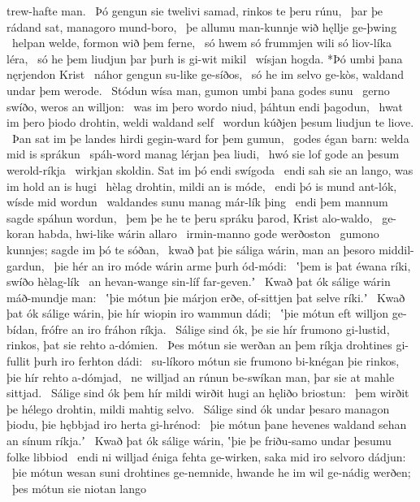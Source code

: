 trew-hafte man. \hld\ Þó gengun sie twelivi samad,
rinkos te þeru rúnu, \hld\ þar þe rádand sat,
managoro mund-boro, \hld\ þe allumu man-kunnje
wið hęllje ge-þwing \hld\ helpan welde,
formon wið þem ferne, \hld\ só hwem só frummjen wili
só liov-líka léra, \hld\ só he þem liudjun þar
þurh is gi-wit mikil \hld\ wísjan hogda.
*Þó umbi þana nęrjendon Krist \hld\ náhor gengun
su-like ge-síðos, \hld\ só he im selvo ge-kòs,
waldand undar þem werode. \hld\ Stódun wísa man,
gumon umbi þana godes sunu \hld\ gerno swíðo,
weros an willjon: \hld\ was im þero wordo niud,
þáhtun endi þagodun, \hld\ hwat im þero þiodo drohtin,
weldi waldand self \hld\ wordun kúðjen
þesum liudjun te liove. \hld\ Þan sat im þe landes hirdi
gegin-ward for þem gumun, \hld\ godes égan barn:
welda mid is sprákun \hld\ spáh-word manag
lérjan þea liudi, \hld\ hwó sie lof gode
an þesum werold-ríkja \hld\ wirkjan skoldin.
Sat im þó endi swígoda \hld\ endi sah sie an lango,
was im hold an is hugi \hld\ hèlag drohtin,
mildi an is móde, \hld\ endi þó is mund ant-lók,
wísde mid wordun \hld\ waldandes sunu
manag már-lík þing \hld\ endi þem mannum sagde
spáhun wordun, \hld\ þem þe he te þeru spráku þarod,
Krist alo-waldo, \hld\ ge-koran habda,
hwi-like wárin allaro \hld\ irmin-manno
gode werðoston \hld\ gumono kunnjes;
sagde im þó te sóðan, \hld\ kwað þat þie sáliga wárin,
man an þesoro middil-gardun, \hld\ þie hér an iro móde wárin
arme þurh ód-módi: \hld\ ʽþem is þat éwana ríki,
swíðo hèlag-lík \hld\ an hevan-wange
sin-líf far-geven.ʼ \hld\ Kwað þat ók sálige wárin
máð-mundje man: \hld\ ʽþie mótun þie márjon erðe,
of-sittjen þat selve ríki.ʼ \hld\ Kwað þat ók sálige wárin,
þie hír wiopin iro wammun dádi; \hld\ ʽþie mótun eft willjon ge-bídan,
frófre an iro fráhon ríkja. \hld\ Sálige sind ók, þe sie hír frumono gi-lustid,
rinkos, þat sie rehto a-dómien. \hld\ Þes mótun sie werðan an þem ríkja drohtines
gi-fullit þurh iro ferhton dádi: \hld\ su-líkoro mótun sie frumono bi-knégan
þie rinkos, þie hír rehto a-dómjad, \hld\ ne willjad an rúnun be-swíkan
man, þar sie at mahle sittjad. \hld\ Sálige sind ók þem hír mildi wirðit
hugi an hęliðo briostun: \hld\ þem wirðit þe hélego drohtin,
mildi mahtig selvo. \hld\ Sálige sind ók undar þesaro managon þiodu,
þie hębbjad iro herta gi-hrénod: \hld\ þie mótun þane hevenes waldand
sehan an sínum ríkja.ʼ \hld\ Kwað þat ók sálige wárin,
ʽþie þe friðu-samo undar þesumu folke libbiod \hld\ endi ni willjad éniga fehta ge-wirken,
saka mid iro selvoro dádjun: \hld\ þie mótun wesan suni drohtines ge-nemnide,
hwande he im wil ge-nádig werðen; \hld\ þes mótun sie niotan lango
